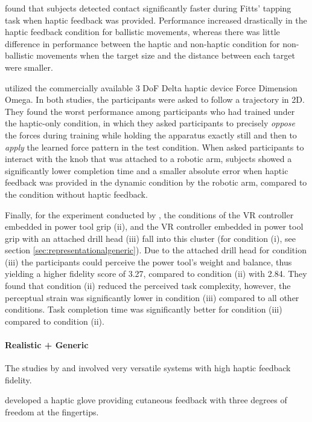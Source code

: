 \cite{Wall2000} found that subjects detected contact significantly faster during Fitts' tapping task when haptic feedback was provided. Performance increased drastically in the haptic feedback condition for ballistic movements, whereas there was little difference in performance between the haptic and non-haptic condition for non-ballistic movements when the target size and the distance between each target were smaller.

\cite{Morris2007} utilized the commercially available 3 DoF Delta haptic device Force Dimension Omega. In both studies, the participants were asked to follow a trajectory in 2D. They found the worst performance among participants who had trained under the haptic-only condition, in which they asked participants to precisely \textit{oppose} the forces during training while holding the apparatus exactly still and then to \textit{apply} the learned force pattern in the test condition. 
When \cite{Dai2023} asked participants to interact with the knob that was attached to a robotic arm, subjects showed a significantly lower completion time and a smaller absolute error when haptic feedback was provided in the dynamic condition by the robotic arm, compared to the condition without haptic feedback.

Finally, for the experiment conducted by \cite{Yang2023}, the conditions of the VR controller embedded in power tool grip (ii), and the VR controller embedded in power tool grip with an attached drill head (iii) fall into this cluster (for condition (i), see section \ref{sec:representationalgeneric}). Due to the attached drill head for condition (iii) the participants could perceive the power tool's weight and balance, thus yielding a higher fidelity score of 3.27, compared to condition (ii) with 2.84. They found that condition (ii) reduced the perceived task complexity, however, the perceptual strain was significantly lower in condition (iii) compared to all other conditions. Task completion time was significantly better for condition (iii) compared to condition (ii).


\paragraph{Realistic + Generic} \label{sec:realisticgeneric}
The studies by \cite{LeeY2019} and \cite{Oezen2022} involved very versatile systems with high haptic feedback fidelity. 

\cite{LeeY2019} developed a haptic glove providing cutaneous feedback with three degrees of freedom at the fingertips. 


